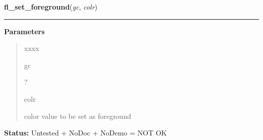     \label{xformslib:library:fl_set_foreground}

    \vspace{0.5ex}

\hspace{.8\funcindent}\begin{boxedminipage}{\funcwidth}

    \raggedright \textbf{fl\_set\_foreground}(\textit{gc}, \textit{colr})

    \vspace{-1.5ex}

    \rule{\textwidth}{0.5\fboxrule}
\setlength{\parskip}{2ex}
\setlength{\parskip}{1ex}
      \textbf{Parameters}
      \vspace{-1ex}

      \begin{quote}
        \begin{Ventry}{xxxx}

          \item[gc]

          ?

          \item[colr]

          color value to be set as foreground

        \end{Ventry}

      \end{quote}

\textbf{Status:} Untested + NoDoc + NoDemo = NOT OK



    \end{boxedminipage}

    \label{xformslib:library:fl_set_background}

    \vspace{0.5ex}

